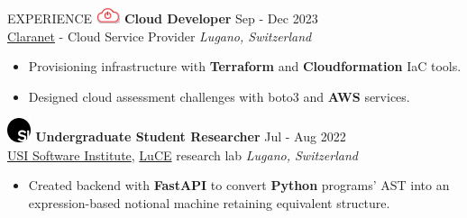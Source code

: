 \documentclass{cv} %
\def\intraexpvspace{0.15cm}
\begin{document}
\begin{minipage}[b][0.9\paperheight][t]{0.7\linewidth}
\begin{rSection}{EXPERIENCE}
        \includegraphics[width=0.7cm, trim={0cm 15cm 0cm 0cm}]{claranet-logo.png}
        \textbf{Cloud Developer} \hfill Sep - Dec 2023\\
        \hspace*{0.85cm}\href{https://www.claranet.com/}{Claranet} - Cloud Service Provider
        \hfill \textit{Lugano, Switzerland}
        \begin{itemize}
            \item Provisioning infrastructure with \textbf{Terraform} and \textbf{Cloudformation}
                  IaC tools.

            \item Designed cloud assessment challenges with boto3 and \textbf{AWS} services.
        \end{itemize}
        \vspace{\intraexpvspace}
        \vspace{\intraexpvspace}

        \includegraphics[width=0.7cm, trim={0cm 10cm 0cm 0cm}]{si-icon.jpg}
        \hspace*{0cm}\textbf{Undergraduate Student Researcher} \hfill Jul - Aug 2022\\
        \hspace*{0.85cm}\href{https://www.si.usi.ch/}{USI Software Institute},
        \href{https://luce.si.usi.ch/team/}{LuCE} research lab
        \hfill \textit{Lugano, Switzerland}
        \begin{itemize}
            \item Created backend with \textbf{FastAPI} to convert \textbf{Python} programs' AST
                  into an expression-based notional machine retaining equivalent structure.
        \end{itemize}
        \vspace{\intraexpvspace}
        \vspace{\intraexpvspace}


\end{rSection}
\end{minipage}
\end{document}
